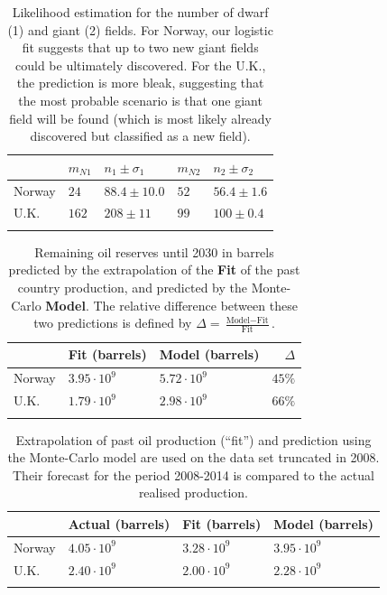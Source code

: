 \documentclass[review]{elsarticle}
\providecommand{\tabularnewline}{\\}
\begin{document}
\begin{table}[h]
\caption{Likelihood estimation for the number of dwarf (1) and giant (2) fields.
For Norway, our logistic fit suggests that up to two new giant fields could be
ultimately discovered. For the U.K., the prediction is more bleak, suggesting
that the most probable scenario is that one giant field will be found (which is most likely already discovered but classified as a new field).}
\centering %
\begin{tabular}{lllll}
 & $m_{N1}$ & $n_{1}\pm\sigma_{1}$ & $m_{N2}$ & $n_{2}\pm\sigma_{2}$\tabularnewline
\midrule Norway  & $24$ & $88.4\pm10.0$ & $52$ & $56.4\pm1.6$\tabularnewline
U.K. & $162$ & $208\pm11$ & $99$ & $100\pm0.4$\tabularnewline
\bottomrule  &  &  &  & \tabularnewline
\end{tabular}\label{likelihood-results}
\end{table}

\pagebreak


\begin{table}[H]
\caption{Remaining oil reserves until 2030 in barrels 
predicted by the extrapolation of the  \textbf{Fit}
of the past country production, and predicted by the Monte-Carlo \textbf{Model}.
The relative difference between these two predictions 
is defined by $\Delta=\frac{\textrm{Model}-\textrm{Fit}}{\textrm{Fit}}$.}
\centering %
\begin{tabular}{lllr}
 & Fit (barrels) & Model (barrels)  & $\Delta$ \tabularnewline
\midrule Norway & $3.95\cdot10^{9}$  & $5.72\cdot10^{9}$  & $45\%$\tabularnewline
U.K. & $1.79\cdot10^{9}$  & $2.98\cdot10^{9}$  & $66\%$ \tabularnewline
\bottomrule  &  &  & \tabularnewline
\end{tabular}\label{forecast-14}
\end{table}

\pagebreak


\begin{table}[H]
\caption{Extrapolation of past oil production (``fit'') and prediction
using the Monte-Carlo model are used on the data set truncated
in 2008. Their forecast for the period 2008-2014 is compared to
the actual realised production.}
\centering %
\begin{tabular}{llll}
 & Actual (barrels) & Fit (barrels) & Model (barrels)\tabularnewline
\midrule Norway & $4.05\cdot10^{9}$  & $3.28\cdot10^{9}$  & $3.95\cdot10^{9}$ \tabularnewline
U.K. & $2.40\cdot10^{9}$  & $2.00\cdot10^{9}$  & $2.28\cdot10^{9}$ \tabularnewline
\bottomrule  &  &  & \tabularnewline
\end{tabular}\label{backtest-08}
\end{table}
\end{document}
